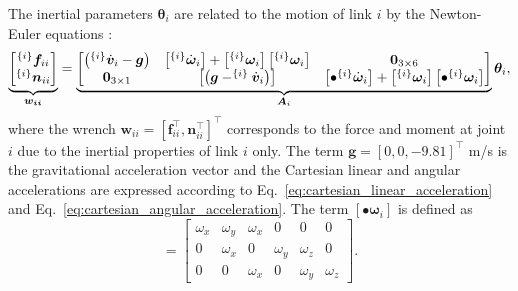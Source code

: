 The inertial parameters $\bm{\theta}_i$ are related to the motion of link $i$
by the Newton-Euler equations \cite{Atkeson1986Estimationinertialparameters}:
\begin{equation}
	\underbrace{
		\begin{bmatrix}
			^{\left\lbrace i \right\rbrace}\bm{f}_{ii} \\ ^{\left\lbrace i \right\rbrace}\bm{n}_{ii}
	\end{bmatrix}}_{\bm{w_{ii}}}= 
	\underbrace{
		\begin{bmatrix}
			\left(^{\left\lbrace i \right\rbrace}\dot{\bm{v}}_i - \bm{g}\right) & \left[^{\left\lbrace i \right\rbrace}\dot{\bm{\omega}}_i\right] + \left[^{\left\lbrace i \right\rbrace}{\bm{\omega}}_i\right]\left[^{\left\lbrace i \right\rbrace}{\bm{\omega}}_i\right] & \bm{0}_{3 \times 6} \\
			\bm{0}_{3\times 1} & \left[\left(\bm{g}  - ^{\left\lbrace i \right\rbrace}\dot{\bm{v}}_i\right)\right] & \left[\bullet {}^{\left\lbrace i \right\rbrace}\dot{\bm{\omega}}_i\right] + \left[^{\left\lbrace i \right\rbrace}{\bm{\omega}}_i\right]\left[\bullet {}^{\left\lbrace i \right\rbrace}{\bm{\omega}}_i\right]
	\end{bmatrix}}_{\bm{A}_i} \bm{\theta}_i,
\end{equation}
where the wrench $\bm{w}_{ii} =\left[\bm{f}_{ii}^\intercal, \bm{n}_{ii}^\intercal\right]^\intercal$ corresponds to the force and moment at joint $i$ due to the inertial properties of link $i$ only. The term $\bm{g} = [0, 0, -9.81]^\intercal$ m/s is the gravitational acceleration vector and the  Cartesian linear and angular accelerations are expressed according to  Eq.~\eqref{eq:cartesian_linear_acceleration} and Eq.~\eqref{eq:cartesian_angular_acceleration}. The term $\left[\bullet{\bm{\omega}}_i\right]$ is defined as
\begin{equation}
	[\bullet \bm{\omega}] = \begin{bmatrix}
		\omega_x & \omega_y & \omega_x & 0        & 0        & 0       \\
		0        & \omega_x & 0        & \omega_y & \omega_z & 0       \\
		0        & 0        & \omega_x & 0        & \omega_y & \omega_z
	\end{bmatrix}.
\end{equation}



